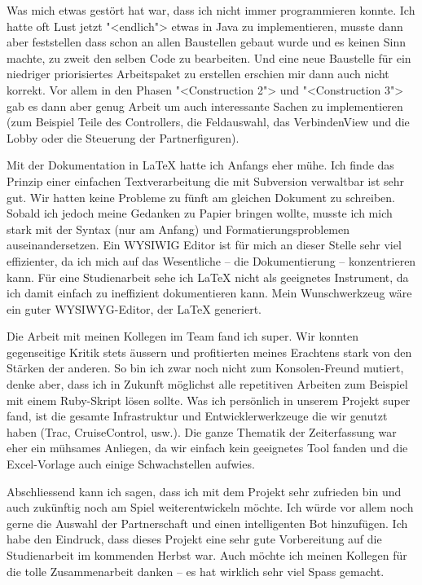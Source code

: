 \documentclass[12pt,halfparskip]{scrartcl}
\begin{document}
Was mich etwas gestört hat war, dass ich nicht immer programmieren konnte. Ich hatte oft Lust jetzt "<endlich"> etwas in Java zu implementieren, musste dann aber feststellen dass schon an allen Baustellen gebaut wurde und es keinen Sinn machte, zu zweit den selben Code zu bearbeiten. Und eine neue Baustelle für ein niedriger priorisiertes Arbeitspaket zu erstellen erschien mir dann auch nicht korrekt. Vor allem in den Phasen "<Construction 2"> und "<Construction 3"> gab es dann aber genug Arbeit um auch interessante Sachen zu implementieren (zum Beispiel Teile des Controllers, die Feldauswahl, das VerbindenView und die Lobby oder die Steuerung der Partnerfiguren).

Mit der Dokumentation in \LaTeX{} hatte ich Anfangs eher mühe. Ich finde das Prinzip einer einfachen Textverarbeitung die mit Subversion verwaltbar ist sehr gut. Wir hatten keine Probleme zu fünft am gleichen Dokument zu schreiben. Sobald ich jedoch meine Gedanken zu Papier bringen wollte, musste ich mich stark mit der Syntax (nur am Anfang) und Formatierungsproblemen auseinandersetzen. Ein WYSIWIG Editor ist für mich an dieser Stelle sehr viel effizienter, da ich mich auf das Wesentliche -- die Dokumentierung -- konzentrieren kann. Für eine Studienarbeit sehe ich \LaTeX{} nicht als geeignetes Instrument, da ich damit einfach zu ineffizient dokumentieren kann. Mein Wunschwerkzeug wäre ein guter WYSIWYG-Editor, der \LaTeX{} generiert.

Die Arbeit mit meinen Kollegen im Team fand ich super. Wir konnten gegenseitige Kritik stets äussern und profitierten meines Erachtens stark von den Stärken der anderen. So bin ich zwar noch nicht zum Konsolen-Freund mutiert, denke aber, dass ich in Zukunft möglichst alle repetitiven Arbeiten zum Beispiel mit einem Ruby-Skript lösen sollte. Was ich persönlich in unserem Projekt super fand, ist die gesamte Infrastruktur und Entwicklerwerkzeuge die wir genutzt haben (Trac, CruiseControl, usw.). Die ganze Thematik der Zeiterfassung war eher ein mühsames Anliegen, da wir einfach kein geeignetes Tool fanden und die Excel-Vorlage auch einige Schwachstellen aufwies.
			
Abschliessend kann ich sagen, dass ich mit dem Projekt sehr zufrieden bin und auch zukünftig noch am Spiel weiterentwickeln möchte. Ich würde vor allem noch gerne die Auswahl der Partnerschaft und einen intelligenten Bot hinzufügen. Ich habe den Eindruck, dass dieses Projekt eine sehr gute Vorbereitung auf die Studienarbeit im kommenden Herbst war. Auch möchte ich meinen Kollegen für die tolle Zusammenarbeit danken -- es hat wirklich sehr viel Spass gemacht.
\end{document}
